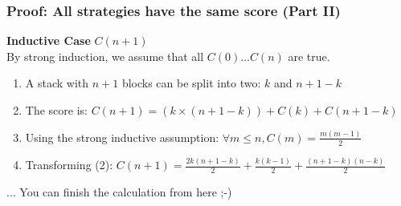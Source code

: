 \begin{frame}
  \frametitle{Proof: All strategies have the same score (Part II)}

    {\bf Inductive Case} $C(n+1)$\\
    By strong induction, we assume that all $C(0)\ldots C(n)$ are true.

    \bigskip

    \begin{enumerate}
    \item A stack with $n+1$ blocks can be split into two: $k$ and $n+1-k$\medskip

    \item The score is: $C(n+1) = (k\times(n+1-k)) + C(k) + C(n+1-k)$\medskip

    \item Using the strong inductive assumption: $\forall m \leq n, C(m) = \frac{m(m-1)}{2}$\medskip
    
    \item Transforming (2): $C(n+1) = \frac{2k(n+1-k)}{2} + \frac{k(k-1)}{2} +
      \frac{(n+1-k)(n-k)}{2}$
  \end{enumerate}\bigskip

  ... You can finish the calculation from here ;-)
\end{frame}
